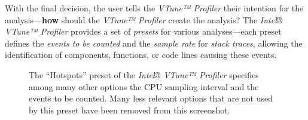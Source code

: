     With the final decision, the user tells the \textit{VTune™ Profiler} their intention for the analysis---\textbf{how} should the \textit{VTune™ Profiler} create the analysis? The \textit{Intel® VTune™ Profiler} provides a set of \emph{presets} for various analyses---each preset defines the \emph{events to be counted} and the \emph{sample rate} for \emph{stack traces}, allowing the identification of components, functions, or code lines causing these events.

\begin{@empty}
    \setlength{\fboxsep}{0pt}%
    \setlength{\fboxrule}{1pt}%
    
    \begin{figure}[h!]
        \centering
        \vspace{.75em}
        \caption[``Hotspots'' preset of the VTune™ Profiler]{The ``Hotspots'' preset of the \textit{Intel® VTune™ Profiler} specifies among many other options the CPU sampling interval and the events to be counted. Many less relevant options that are not used by this preset have been removed from this screenshot.}
        \label{fig:vtunehotspots}
    \end{figure}
\end{@empty}

